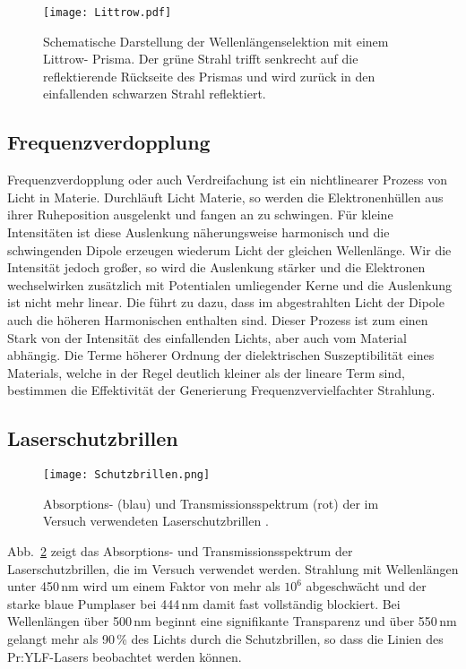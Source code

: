 \begin{figure}[H]
\begin{center}
  \texttt{[image: Littrow.pdf]}
  \caption{Schematische Darstellung der Wellenlängenselektion mit einem Littrow- Prisma. Der grüne Strahl trifft senkrecht auf die reflektierende Rückseite des Prismas und wird zurück in den einfallenden schwarzen Strahl reflektiert.}
  \label{img:littrow}
\end{center}
\end{figure}



\subsection{Frequenzverdopplung}


Frequenzverdopplung oder auch Verdreifachung ist ein nichtlinearer Prozess von Licht in Materie.
Durchläuft Licht Materie, so werden die Elektronenhüllen aus ihrer Ruheposition ausgelenkt und fangen an zu schwingen. Für kleine Intensitäten ist diese Auslenkung näherungsweise harmonisch und
die schwingenden Dipole erzeugen wiederum Licht der gleichen Wellenlänge.
Wir die Intensität jedoch großer, so wird die Auslenkung stärker und die Elektronen wechselwirken zusätzlich mit Potentialen umliegender Kerne und die Auslenkung ist nicht mehr linear. 
Die führt zu dazu, dass im abgestrahlten Licht der Dipole auch die höheren Harmonischen enthalten
sind. Dieser Prozess ist zum einen Stark von der Intensität des einfallenden Lichts, aber auch
vom Material abhängig. Die Terme höherer Ordnung der dielektrischen Suszeptibilität eines Materials, welche in der Regel deutlich kleiner als der lineare Term sind, bestimmen die Effektivität der Generierung Frequenzvervielfachter Strahlung.




\subsection{Laserschutzbrillen}

\begin{figure}[H]
\begin{center}
  \texttt{[image: Schutzbrillen.png]}
  \caption{Absorptions- (blau)  und Transmissionsspektrum (rot) der im Versuch
  verwendeten Laserschutzbrillen \cite{Versuchsanleitung}.}
  \label{img:Schutzbrillen}
\end{center}
\end{figure}

Abb.~\ref{img:Schutzbrillen} zeigt das Absorptions- und Transmissionsspektrum der
Laserschutzbrillen, die im Versuch verwendet werden.
Strahlung mit Wellenlängen unter 450\,nm wird um einem Faktor von mehr als $10^6$ abgeschwächt und
der starke blaue Pumplaser bei 444\,nm damit fast vollständig blockiert.
Bei Wellenlängen über 500\,nm beginnt eine signifikante Transparenz und über 550\,nm gelangt mehr
als 90\,\% des Lichts durch die Schutzbrillen,
so dass die Linien des Pr:YLF-Lasers beobachtet werden können.


